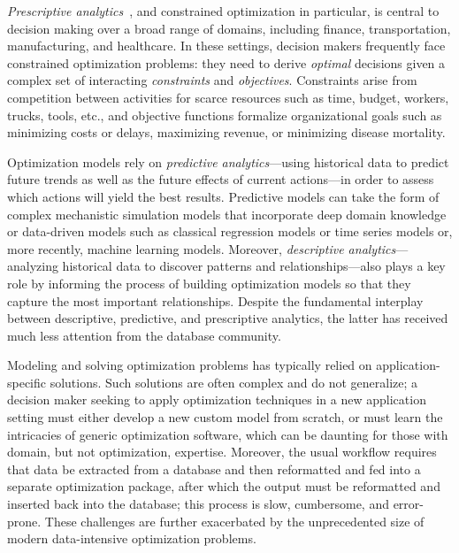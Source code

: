 \documentclass[11pt]{article}
\begin{document}
\emph{Prescriptive analytics}~\cite{HaasMST11,LustigDJD10}, and constrained optimization in particular, is central to decision making over a broad range of domains, including finance, transportation, manufacturing, and healthcare. In these settings, decision makers frequently face constrained optimization problems: they need to derive \emph{optimal} decisions given a complex set of interacting \emph{constraints} and \emph{objectives}. Constraints arise from
competition between activities for scarce resources such as time, budget, workers, trucks, tools, etc., and objective functions formalize organizational goals such as minimizing costs or delays, maximizing revenue, or minimizing disease mortality.

Optimization models rely on \emph{predictive analytics}---using historical data to predict future trends as well as the future effects of current actions---in order to assess which actions will yield the best results. Predictive models can take the form of complex mechanistic simulation models that incorporate deep domain knowledge or data-driven models such as classical regression models or time series models or, more recently, machine learning models.
Moreover, \emph{descriptive analytics}---analyzing historical data to discover patterns and relationships---also plays a key role by informing the process of building optimization models so that they capture the most important relationships. Despite the fundamental interplay between
descriptive, predictive, and prescriptive analytics, the latter has received much less attention from the database community.

Modeling and solving optimization problems has typically relied on
application-specific solutions. Such solutions are often complex and do not
generalize; a decision maker seeking to apply optimization techniques in a new
application setting must either develop a new custom model from scratch, or
must learn the intricacies of generic optimization software, which can be
daunting for those with domain, but not optimization, expertise. Moreover, the
usual workflow requires that data be extracted from a database and then
reformatted and fed into a separate optimization package, after which the
output must be reformatted and inserted back into the database; this process is
slow, cumbersome, and error-prone. These challenges are further exacerbated by
the unprecedented size of modern data-intensive optimization problems.
\end{document}
